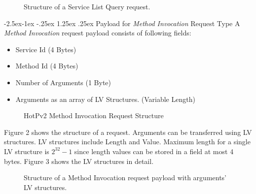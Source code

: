 \documentclass[10pt,a4paper]{article}
\makeatletter
\renewcommand\paragraph{\@startsection{paragraph}{4}{\z@}%
            {-2.5ex\@plus -1ex \@minus -.25ex}%
            {1.25ex \@plus .25ex}%
            {\normalfont\normalsize\bfseries}}
\makeatother
\begin{document}
\begin{figure}[!ht]
  \caption{Structure of a Service List Query request.}
  \centering
\end{figure}

\paragraph{Payload for \textit{Method Invocation} Request Type}
A \textit{Method Invocation} request payload consists of following fields:
\begin{itemize}
  \item Service Id (4 Bytes)
  \item Method Id (4 Bytes)
  \item Number of Arguments (1 Byte)
  \item Arguments as an array of LV Structures. (Variable Length)
\end{itemize}

\begin{figure}[!ht]
  \caption{HotPv2 Method Invocation Request Structure}
  \centering
\end{figure}

Figure 2 shows the structure of a request. Arguments can be transferred using LV structures. LV structures include Length and Value. Maximum length for a single LV structure is $2^{32} - 1$ since length values can be stored in a field at most 4 bytes. Figure 3 shows the LV structures in detail.

\begin{figure}[!ht]
  \caption{Structure of a Method Invocation request payload with arguments' LV structures.}
  \centering
\end{figure}
\end{document}
